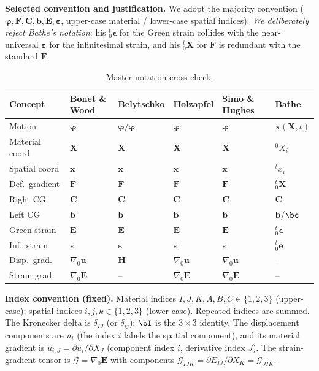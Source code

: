 \documentclass[11pt]{article}
\newcommand{\gradz}{\nabla_{0}}
\newcommand{\bX}{\mathbf{X}}
\newcommand{\bx}{\mathbf{x}}
\newcommand{\bp}{\boldsymbol{\varphi}}
\newcommand{\bu}{\mathbf{u}}
\newcommand{\bF}{\mathbf{F}}
\newcommand{\bC}{\mathbf{C}}
\newcommand{\bb}{\mathbf{b}}
\newcommand{\bE}{\mathbf{E}}
\newcommand{\bep}{\boldsymbol{\varepsilon}}
\newcommand{\bH}{\mathbf{H}}
\newcommand{\gradz}{\nabla_{0}}
\newcommand{\bX}{\mathbf{X}}
\newcommand{\bx}{\mathbf{x}}
\newcommand{\bp}{\boldsymbol{\varphi}}
\newcommand{\bphi}{\boldsymbol{\varphi}}
\newcommand{\bu}{\mathbf{u}}
\newcommand{\bF}{\mathbf{F}}
\newcommand{\bC}{\mathbf{C}}
\newcommand{\bb}{\mathbf{b}}
\newcommand{\bE}{\mathbf{E}}
\newcommand{\bep}{\boldsymbol{\varepsilon}}
\newcommand{\bH}{\mathbf{H}}
\begin{document}
\textbf{Selected convention and justification.} We adopt the majority
convention ($\bp,\bF,\bC,\bb,\bE,\bep$, upper-case material /
lower-case spatial indices). \emph{We deliberately reject Bathe's
notation}: his ${}^{t}_{0}\boldsymbol{\epsilon}$ for the Green strain
collides with the near-universal $\boldsymbol{\varepsilon}$ for the
infinitesimal strain, and his ${}^{t}_{0}\mathbf{X}$ for $\bF$ is
redundant with the standard $\bF$.

\begin{table}[h]
\centering
\caption{Master notation cross-check.}\label{tab:master}
\begin{tabular}{llllll}
\toprule
Concept & Bonet \& Wood & Belytschko & Holzapfel & Simo \& Hughes & Bathe \\
\midrule
Motion & $\bp$ & $\bphi/\bp$ & $\bp$ & $\bp$ & $\bx(\bX,t)$ \\
Material coord & $\bX$ & $\bX$ & $\bX$ & $\bX$ & ${}^{0}X_{i}$ \\
Spatial coord & $\bx$ & $\bx$ & $\bx$ & $\bx$ & ${}^{t}x_{i}$ \\
Def.\ gradient & $\bF$ & $\bF$ & $\bF$ & $\bF$ & ${}^{t}_{0}\mathbf{X}$ \\
Right CG & $\bC$ & $\bC$ & $\bC$ & $\bC$ & $\bC$ \\
Left CG & $\bb$ & $\bb$ & $\bb$ & $\bb$ & $\bb$/$\bc$ \\
Green strain & $\bE$ & $\bE$ & $\bE$ & $\bE$ & ${}^{t}_{0}\boldsymbol{\epsilon}$ \\
Inf.\ strain & $\bep$ & $\bep$ & $\bep$ & $\bep$ & ${}^{t}_{0}\mathbf{e}$ \\
Disp.\ grad. & $\gradz\bu$ & $\bH$ & $\gradz\bu$ & $\gradz\bu$ & -- \\
Strain grad. & $\gradz\bE$ & -- & $\gradz\bE$ & $\gradz\bE$ & -- \\
\bottomrule
\end{tabular}
\end{table}

\textbf{Index convention (fixed).} Material indices
$I,J,K,A,B,C\in\{1,2,3\}$ (upper-case); spatial indices
$i,j,k\in\{1,2,3\}$ (lower-case). Repeated indices are summed. The
Kronecker delta is $\delta_{IJ}$ (or $\delta_{ij}$); $\bI$ is the
$3\times3$ identity. The displacement components are $u_{i}$ (the
index $i$ labels the spatial component), and its material gradient is
$u_{i,J}=\partial u_{i}/\partial X_{J}$ (component index $i$,
derivative index $J$). The strain-gradient tensor is
$\bm{\mathcal{G}}=\gradz\bE$ with components
$\mathcal{G}_{IJK}=\partial E_{IJ}/\partial X_{K}=\mathcal{G}_{JIK}$.
\end{document}
